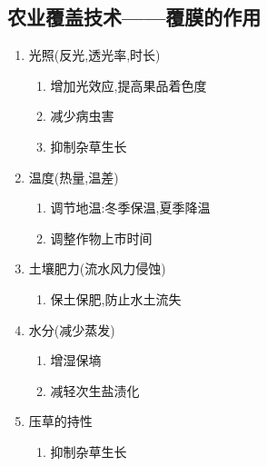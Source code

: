 \documentclass[a4paper]{article}
\begin{document}
    \subsection{农业覆盖技术——覆膜的作用}
    \begin{enumerate}
        \item 光照(反光,透光率,时长)
        \begin{enumerate}
            \item 增加光效应,提高果品着色度
            \item 减少病虫害
            \item 抑制杂草生长
        \end{enumerate}
        \item 温度(热量,温差)
        \begin{enumerate}
            \item 调节地温:冬季保温,夏季降温
            \item 调整作物上市时间
        \end{enumerate}
        \item 土壤肥力(流水风力侵蚀)
        \begin{enumerate}
            \item 保土保肥,防止水土流失
        \end{enumerate}
        \item 水分(减少蒸发)
        \begin{enumerate}
            \item 增湿保墒
            \item 减轻次生盐渍化
        \end{enumerate}
        \item 压草的持性
        \begin{enumerate}
            \item 抑制杂草生长
        \end{enumerate}
    \end{enumerate}
\end{document}
